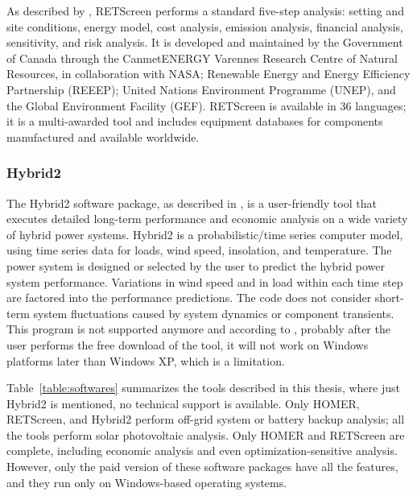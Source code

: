 As described by \cite{Pradhan}, RETScreen performs a standard five-step analysis: setting and site conditions, energy model, cost analysis, emission analysis, financial analysis, sensitivity, and risk analysis. It is developed and maintained by the Government of Canada through the CanmetENERGY Varennes Research Centre of Natural Resources, in collaboration with NASA; Renewable Energy and Energy Efficiency Partnership (REEEP); United Nations Environment Programme (UNEP), and the Global Environment Facility (GEF). RETScreen is available in 36 languages; it is a multi-awarded tool and includes equipment databases for components manufactured and available worldwide.

\subsubsection{Hybrid2}

The Hybrid2 software package, as described in \cite{Mills}, is a user-friendly tool that executes detailed long-term performance and economic analysis on a wide variety of hybrid power systems. Hybrid2 is a probabilistic/time series computer model, using time series data for loads, wind speed, insolation, and temperature. The power system is designed or selected by the user to predict the hybrid power system performance. Variations in wind speed and in load within each time step are factored into the performance predictions. The code does not consider short-term system fluctuations caused by system dynamics or component transients. This program is not supported anymore and according to \cite{UMASS}, probably after the user performs the free download of the tool, it will not work on Windows platforms later than Windows XP, which is a limitation.

Table~\ref{table:softwares} summarizes the tools described in this thesis, where just Hybrid2 is mentioned, no technical support is available. Only HOMER, RETScreen, and Hybrid2 perform off-grid system or battery backup analysis; all the tools perform solar photovoltaic analysis. Only HOMER and RETScreen are complete, including economic analysis and even optimization-sensitive analysis. However, only the paid version of these software packages have all the features, and they run only on Windows-based operating systems.

